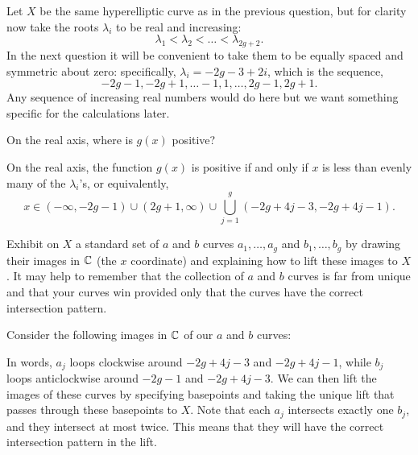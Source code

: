 \documentclass[expanded]{lkx_pset}
\begin{document}
\begin{problem}{3}
Let $X$ be the same hyperelliptic curve as in the previous question, but for clarity now take the roots  $\lambda_{i}$ to be real and increasing:
\[
	\lambda_{1} < \lambda_{2} < \dots < \lambda_{2g+2}.
\]
In the next question it will be convenient to take them to be equally spaced and symmetric about zero: specifically, $\lambda_{i}= -2g-3+2i$, which is the sequence,
\[
	-2g-1, -2g+1, \dots -1, 1, \dots , 2g-1, 2g+1.
\]
Any sequence of increasing real numbers would do
here but we want something specific for the calculations later.
\end{problem}

\begin{parts}
	\begin{part}{}
		On the real axis, where is $g(x)$ positive?
	\end{part}

	On the real axis, the function $g(x)$ is positive if and only if $x$ is less than evenly many of the $\lambda_i$'s, or equivalently,
	\[
		x\in (-\infty, -2g-1)\cup (2g+1,\infty)\cup \bigcup^g_{j=1}(-2g+4j-3, -2g+4j-1).
	\]

	\begin{part}{}
		Exhibit on $X$ a standard set of $a$ and $b$ curves $a_{1},\dots , a_{g}$ and $b_{1},\dots, b_{g}$ by drawing their images in $\mathbb{C}$ (the $x$ coordinate) and explaining how to lift these images to $X$. It may help to remember that the collection of $a$ and $b$ curves is far from unique and that your curves win provided only that the curves have the correct intersection pattern.
	\end{part}

	Consider the following images in $\mathbb{C}$ of our $a$ and $b$ curves:
	\begin{center}
	\end{center}

	In words, $a_j$ loops clockwise around $-2g+4j-3$ and $-2g+4j-1$, while $b_j$ loops anticlockwise around $-2g-1$ and $-2g+4j-3$. We can then lift the images of these curves by specifying basepoints and taking the unique lift that passes through these basepoints to $X$. Note that each $a_j$ intersects exactly one $b_j$, and they intersect at most twice. This means that they will have the correct intersection pattern in the lift.
\end{parts}
\end{document}
